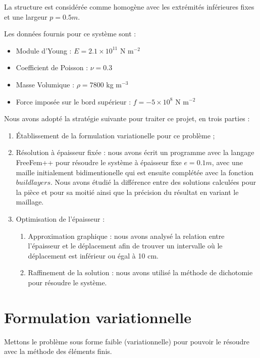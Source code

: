 \documentclass{article}
\begin{document}
    La structure est considérée comme homogène avec les extrémités inférieures fixes et une largeur $p = 0.5 m$. 
    
    Les données fournis pour ce système sont :
    
    \begin{itemize}
    \item Module d'Young : $E = 2.1 \times 10^11$ N m$^{-2}$
    \item Coefficient de Poisson : $\nu = 0.3$ 
    \item Masse Volumique : $\rho = 7800$ kg m$^{-3}$
    \item Force imposée sur le bord supérieur : $f= - 5 \times 10^8$ N m$^{-2}$
    \end{itemize}
    
    Nous avons adopté la stratégie suivante pour traiter ce projet, en trois parties :
    \begin{enumerate}
        \item Établissement de la formulation variationelle pour ce problème ;
        \item Résolution à épaisseur fixée : nous avons écrit un programme avec la langage FreeFem++ pour résoudre le système à épaisseur fixe $e = 0.1 m$, 
            avec une maille initialement bidimentionelle qui est ensuite complétée avec la fonction $buildlayers$. 
            Nous avons étudié la différence entre des solutions calculées pour la pièce et pour sa moitié ainsi que la précision du résultat en variant le maillage.
        \item Optimisation de l'épaisseur :
        \begin{enumerate}
            \item Approximation graphique : 
                nous avons analysé la relation entre l'épaisseur et le déplacement afin de trouver un intervalle où le déplacement est inférieur ou égal à 10 cm.
            \item Raffinement de la solution : nous avons utilisé la méthode de dichotomie pour résoudre le système.
        \end{enumerate}
    \end{enumerate}

    \newpage
    
    \section{Formulation variationnelle}

    \begin{problem}{1}
    Mettons le problème sous forme faible (variationnelle) pour pouvoir le résoudre avec la méthode des éléments finis.
    \end{problem}
    
\end{document}
